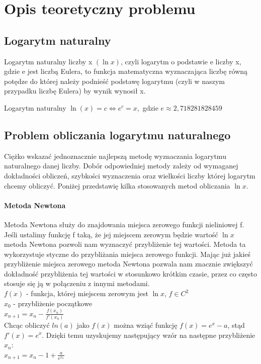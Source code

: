 \documentclass[10pt]{article}
\begin{document}
\section{Opis teoretyczny problemu}

\subsection{Logarytm naturalny}
Logarytm naturalny liczby x $(\ln x)$, czyli logarytm o podstawie e liczby x, gdzie e jest liczbą Eulera, to funkcja matematyczna wyznaczająca liczbę równą potędze do której należy podnieść podstawę logarytmu (czyli w naszym przypadku liczbę Eulera) by wynik wynosił x. \\
\theoremstyle{definition}
\begin{definition}{Logarytm naturalny}
\begin{math}
\ln(x) = c \Longleftrightarrow e^c = x,
\end{math}
gdzie $e \approx 2,718281828459$
\end{definition}

\subsection{Problem obliczania logarytmu naturalnego}
Ciężko wskazać jednoznacznie najlepszą metodę wyznaczania logarytmu naturalnego danej liczby. Dobór odpowiedniej metody zależy od wymaganej dokładności obliczeń, szybkości wyznaczenia oraz wielkości liczby której logarytm chcemy obliczyć. Poniżej przedstawię kilka stosowanych metod obliczania $\ln x$.\\

\paragraph{Metoda Newtona}

Metoda Newtona służy do znajdowania miejsca zerowego funkcji nieliniowej f. Jeśli ustalimy funkcję f taką, że jej miejscem zerowym będzie wartość $\ln x$ metoda Newtona pozwoli nam wyznaczyć przybliżenie tej wartości. Metoda ta wykorzystuje styczne do przybliżania miejsca zerowego funkcji. Mając już jakieś przybliżenie miejsca zerowego metoda Newtona pozwala nam znacznie zwiększyć dokładność przybliżenia tej wartości w stosunkowo krótkim czasie, przez co często stosuje się ją w połączeniu z innymi metodami.\\
$f(x)$ - funkcja, której miejscem zerowym jest $\ln x$, $f \in C^{2}$ \\
$x_{0}$ - przybliżenie początkowe \\
$x_{n+1} = x_{n} - \frac{f(x_{n})}{f'(x_{n})}$\\
Chcąc obliczyć $ln(a)$ jako $f(x)$ można wziąć funkcję $f(x) = e^{x} - a$, stąd $f'(x) = e^{x}$. Dzięki temu uzyskujemy następujący wzór na następne przybliżenie $x_{n}$:\\
$x_{n+1} = x_{n} - 1 + \frac{a}{e^{x_{n}}}$
\end{document}
